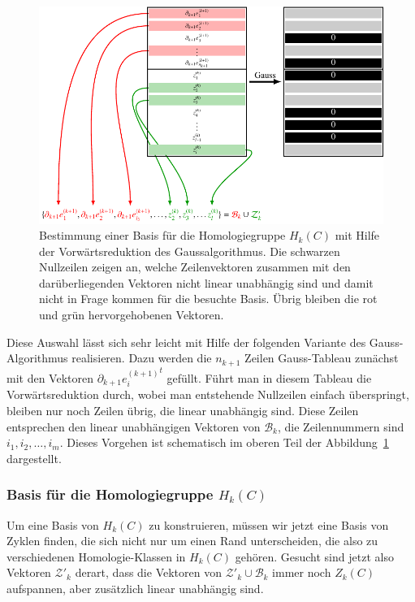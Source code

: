 \begin{figure}
\centering
\includegraphics{chapters/95-homologie/images/gausshomobasis.pdf}
\caption{Bestimmung einer Basis für die Homologiegruppe $H_k(C)$ mit
Hilfe der Vorwärtsreduktion des Gaussalgorithmus.
Die schwarzen Nullzeilen zeigen an, welche Zeilenvektoren zusammen mit
den darüberliegenden Vektoren nicht linear unabhängig sind und damit nicht
in Frage kommen für die besuchte Basis.
Übrig bleiben die {\color{red}rot} und {\color{darkgreen}grün} hervorgehobenen
Vektoren.
\label{buch:homologie:fig:gausshomobasis}}
\end{figure}

Diese Auswahl lässt sich sehr leicht mit Hilfe der folgenden
Variante des Gauss-Algorithmus realisieren.
Dazu werden die $n_{k+1}$ Zeilen Gauss-Tableau zunächst mit den Vektoren
$\partial_{k+1}{e_i^{(k+1)}}^t$ gefüllt.
Führt man in diesem Tableau die Vorwärtsreduktion durch, wobei man
entstehende Nullzeilen einfach überspringt, bleiben nur noch Zeilen
übrig, die linear unabhängig sind.
Diese Zeilen entsprechen den linear unabhängigen Vektoren von $\mathcal{B}_k$,
die Zeilennummern sind $i_1,i_2,\dots,i_m$.
Dieses Vorgehen ist schematisch im oberen Teil der
Abbildung~\ref{buch:homologie:fig:gausshomobasis} dargestellt.

\subsubsection{Basis für die Homologiegruppe $H_k(C)$}
Um eine Basis von $H_k(C)$ zu konstruieren, müssen wir jetzt eine
Basis von Zyklen finden, die sich nicht nur um einen Rand unterscheiden,
die also zu verschiedenen Homologie-Klassen in $H_k(C)$ gehören.
Gesucht sind jetzt also Vektoren $\mathcal{Z}'_k$ derart, dass 
die Vektoren von $\mathcal{Z}'_k\cup\mathcal{B}_k$ immer noch $Z_k(C)$
aufspannen, aber zusätzlich linear unabhängig sind.

